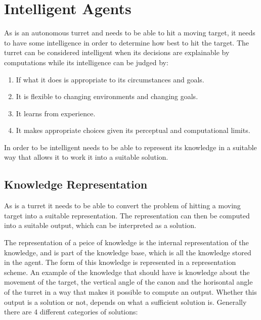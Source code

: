 \section{Intelligent Agents}

As \name is an autonomous turret and needs to be able to hit a moving target,
it needs to have some intelligence in order to determine how best to hit the
target. The turret can be considered intelligent when its decisions
are explainable by computations while its intelligence can be judged
by\cite{MIBook}:

\begin{enumerate}
  \item If what it does is appropriate to its circumstances and goals.
  \item It is flexible to changing environments and changing goals.
  \item It learns from experience.
  \item It makes appropriate choices given its perceptual and computational
  limits.
\end{enumerate}

In order to be intelligent \name needs to be able to represent its knowledge in
a suitable way that allows it to work it into a suitable solution.

\subsection{Knowledge Representation}\label{KR}

As \name is a turret it needs to be able to convert the problem of hitting a
moving target into a suitable representation. The representation can then be
computed into a suitable output, which can be interpreted as a solution.


The representation of a peice of knowledge is the internal representation of the
knowledge, and is part of the knowledge base, which is all the knowledge stored
in the agent. The form of this knowledge is represented in a representation
scheme\cite{MIBook}. An example of the knowledge that \name should have is 
knowledge about the movement of the target, the vertical angle of the canon and
the horisontal angle of the turret in a way that makes it possible to compute an
output. Whether this output is a solution or not, depends on what a sufficient
solution is. Generally there are 4 different categories of solutions:

